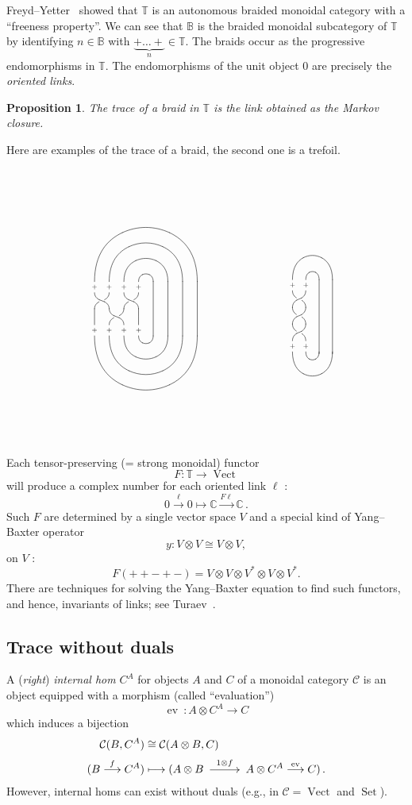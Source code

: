 \documentclass[a4paper,12pt]{article}
\makeatletter
\newtheorem*{Proposition}{Proposition}
\theoremstyle{definition}
\theoremstyle{fact}
\theoremstyle{genquest}
\theoremstyle{step}
\newcommand{\BB}{\mathbb{B}}
\newcommand{\catC}{\mathcal{C}}
\newcommand{\CC}{\mathbb{C}}
\newcommand{\Set}{\operatorname{Set}}
\newcommand{\TT}{\mathbb{T}}
\newcommand{\Vect}{\operatorname{Vect}}
\newcommand{\ev}{\operatorname{ev}}
\newcommand{\longto}{\longrightarrow}
\newcommand{\xylongto}[2][2pt]{{\UseTips{}\xymatrix @C+#1{ \ar[r]^{#2}&}}}
\makeatother
\begin{document}
Freyd--Yetter~\cite{FreydYetter1989}  showed that $\TT$ is an autonomous braided monoidal category with a ``freeness property''. 
We can see that $\BB$ is the braided monoidal subcategory of $\TT$ by identifying $n \in \BB$ with  $\underbrace{+ \ldots +}_n \in \TT$.   
The braids occur as the progressive endomorphisms in $\TT$.   
The endomorphisms of the unit object 0 are precisely the \emph{oriented links}.

\begin{Proposition}
The trace of a braid in $\TT$ is the link obtained as the Markov closure.
\end{Proposition}
%
Here are examples of the trace of a braid, the second one is a trefoil.

\vskip-1.5cm\[
\xygraph{!{/r1.1pc/: /u1.2pc/::}
[uu] ( ?*+!D\txt\tiny{+}  !{+U\vcap[7]} [r(7)]="a7" , !{\vtwistneg}
( !{\xcapv-@(0)} []*+!U\txt\tiny{+} !{+D\vcap[-7]} [r(7)] - "a7"
 , [r] !{\vtwistneg} ( 
   ?*+!U\txt\tiny{+} !{+D\vcap[-5]} [r(5)] !{\POS= "a5"}
   , [r]*+!U\txt\tiny{+} !{+D\vcap[-3]}  [rrr]="a3"
 ) , [urrr] (
     ?*+!D\txt\tiny{+} !{+U\vcap} [r] !{\POS= "a1"}
    , [l]*+!D\txt\tiny{+} !{+U\vcap[3]} [rrr]- "a3"
    , [ll]*+!D\txt\tiny{+} !{+U\vcap[5]} [r(5)]- "a5"
 , [l]!{\vtwistneg}
   [r]!{\xcapv@(0)} []*+!U\txt\tiny{+} !{+D\vcap[-]} [r]- "a1"
)))}
\qquad\qquad\qquad\qquad
\xygraph{ !{0;/r1pc/:/u1.25pc/::} [uu]
 ( !{\vtwist\vtwist\vtwist}[uuu] 
   (?*+!D\txt\tiny{+} !{+U\vcap[3]}[rrr]-[d(4.45)] 
   , [r]*+!D\txt\tiny{+} !{+U\vcap}[r]-[d(4.45)]  )
 , [ddd]*+!U\txt\tiny{+} !{+D\vcap[-3]} 
 , [dddr]*+!U\txt\tiny{+} !{+D\vcap[-1]}
 )}
\]
\vskip-35pt
\noindent
Each tensor-preserving (= strong monoidal) functor
\[
F : \TT   \longto \Vect
\]
will produce a complex number for each oriented link $\ell$ :
\[
0 \stackrel{\ell}{\longto}  0   \longmapsto \CC  \stackrel{F\ell}{\longto} \CC\,.
\]
Such $F$ are determined by a single vector space $V$ and a special kind of Yang--Baxter operator
\[
y : V \otimes V \cong V \otimes V,
\]
on $V$ :
\[
F (+ + - + -) = V \otimes V \otimes V^\ast \otimes V \otimes V^\ast.
\]
There are techniques for solving the Yang--Baxter equation to find such functors, and hence, invariants of links; 
see Turaev~\cite{Turaev1988}.

\subsection{Trace without duals}

A (\emph{right}) \emph{internal hom} $C^A$ for objects $A$ and $C$ of a monoidal category $\catC$ is an object equipped with a morphism (called ``evaluation'')
\[
\ev \ : A \otimes C^A \longto C
\]
which induces a bijection
\begin{align*}
\catC (B,C^A) &\cong \catC (A \otimes B, C)
\\
(B  \stackrel{f}{\longto} C^A) 
  &\longmapsto (A \otimes B \xylongto{1 \otimes f} %
  A \otimes C^A \stackrel{\ev}{\longto}   C)\,. 
\end{align*}
However, internal homs can exist without duals (e.g., in $\catC = \Vect $ and $ \Set $).
\end{document}
